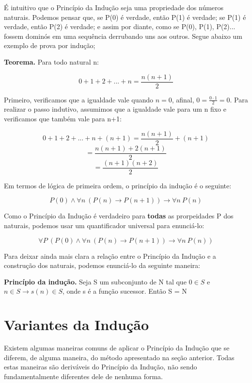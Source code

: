 É intuitivo que o Princípio da Indução seja uma propriedade dos números naturais. Podemos pensar que, se P(0) é verdade, então P(1) é verdade; se P(1) é verdade, então P(2) é verdade; e assim por diante, como se P(0), P(1), P(2)... fossem dominós em uma sequência derrubando uns aos outros. Segue abaixo um exemplo de prova por indução;


 \textbf{Teorema.} Para todo natural n:
\begin{center}
\[0 + 1 + 2 + ... + n = \frac{n(n+1)}{2}\]
\end{center}

Primeiro, verificamos que a igualdade vale quando $n = 0$, afinal, $0 = \frac{0\cdot1}{2} = 0$. Para realizar o passo indutivo, assumimos que a igualdade vale para um n fixo e verificamos que também vale para n+1:
\begin{center}
\[0 + 1 + 2 + ... + n + (n + 1)= \frac{n(n+1)}{2} + (n + 1)\]
\[=\frac{n(n+1) + 2(n + 1)}{2}\]
\[=\frac{(n+1)(n + 2)}{2}\]
\end{center}

Em termos de lógica de primeira ordem, o princípio da indução é o seguinte:
\begin{center}
\[P(0)  \land \forall n \ (P(n) \to P(n+1)) \to \forall n \ P(n) \]
\end{center}

Como o Princípio da Indução é verdadeiro para \textbf{todas} as prorpeidades P dos naturais, podemos usar um quantificador universal para enunciá-lo:
\begin{center}
\[\forall P \ (P(0)  \land \forall n \ (P(n) \to P(n+1)) \to \forall n \ P(n)) \]
\end{center}

Para deixar ainda mais clara a relação entre o Princípio da Indução e a construção dos naturais, podemos enunciá-lo da seguinte maneira:

\textbf{Princípio da indução.} Seja S um subconjunto de N tal que $0 \in S$ e $n \in S \to s(n) \in S$, onde s é a função sucessor. Então S = N

\section{Variantes da Indução}
Existem algumas maneiras comuns de aplicar o Princípio da Indução que se diferem, de alguma maneira, do método apresentado na seção anterior. Todas estas maneiras são deriváveis do Princípio da Indução, não sendo fundamentalmente diferentes dele de nenhuma forma.

